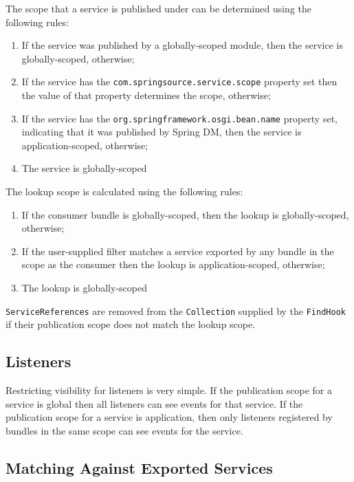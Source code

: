 \documentclass[a4paper]{article}
\begin{document}
The scope that a service is published under can be determined using the following rules:

\begin{enumerate}
\item If the service was published by a globally-scoped module, then the service is globally-scoped, otherwise;
\item If the service has the \texttt{com.springsource.service.scope} property set then the value of that property determines the scope, otherwise;
\item If the service has the \texttt{org.springframework.osgi.bean.name} property set, indicating that it was published by Spring DM, then the service is application-scoped, otherwise;
\item The service is globally-scoped
\end{enumerate}

The lookup scope is calculated using the following rules:

\begin{enumerate}
\item If the consumer bundle is globally-scoped, then the lookup is globally-scoped, otherwise;
\item If the user-supplied filter matches a service exported by any bundle in the scope as the consumer then the lookup is application-scoped, otherwise;
\item The lookup is globally-scoped
\end{enumerate}

\texttt{ServiceReferences} are removed from the \texttt{Collection} supplied by the \texttt{FindHook} if their publication scope does not match the lookup scope.

\subsection{Listeners}

Restricting visibility for listeners is very simple. If the publication scope for a service is global then all listeners can see events for that service. If the publication scope for a service is application, then only listeners registered by bundles in the same scope can see events for the service.

\subsection{Matching Against Exported Services}
\end{document}
